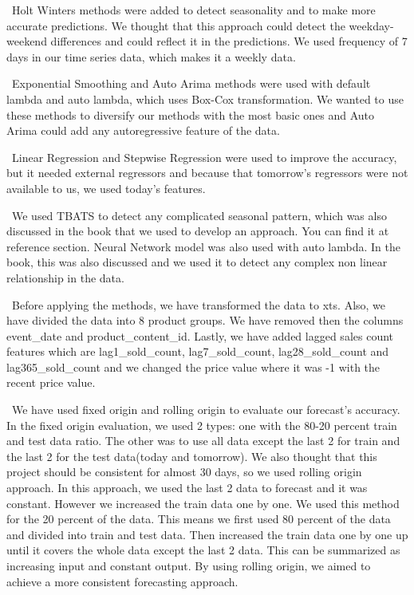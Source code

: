 \documentclass[]{article}
\begin{document}
~Holt Winters methods were added to detect seasonality and to make more
accurate predictions. We thought that this approach could detect the
weekday-weekend differences and could reflect it in the predictions. We
used frequency of 7 days in our time series data, which makes it a
weekly data.

~Exponential Smoothing and Auto Arima methods were used with default
lambda and auto lambda, which uses Box-Cox transformation. We wanted to
use these methods to diversify our methods with the most basic ones and
Auto Arima could add any autoregressive feature of the data.

~Linear Regression and Stepwise Regression were used to improve the
accuracy, but it needed external regressors and because that tomorrow's
regressors were not available to us, we used today's features.

~We used TBATS to detect any complicated seasonal pattern, which was
also discussed in the book that we used to develop an approach. You can
find it at reference section. Neural Network model was also used with
auto lambda. In the book, this was also discussed and we used it to
detect any complex non linear relationship in the data.

~Before applying the methods, we have transformed the data to xts. Also,
we have divided the data into 8 product groups. We have removed then the
columns event\_date and product\_content\_id. Lastly, we have added
lagged sales count features which are lag1\_sold\_count,
lag7\_sold\_count, lag28\_sold\_count and lag365\_sold\_count and we
changed the price value where it was -1 with the recent price value.

~We have used fixed origin and rolling origin to evaluate our forecast's
accuracy. In the fixed origin evaluation, we used 2 types: one with the
80-20 percent train and test data ratio. The other was to use all data
except the last 2 for train and the last 2 for the test data(today and
tomorrow). We also thought that this project should be consistent for
almost 30 days, so we used rolling origin approach. In this approach, we
used the last 2 data to forecast and it was constant. However we
increased the train data one by one. We used this method for the 20
percent of the data. This means we first used 80 percent of the data and
divided into train and test data. Then increased the train data one by
one up until it covers the whole data except the last 2 data. This can
be summarized as increasing input and constant output. By using rolling
origin, we aimed to achieve a more consistent forecasting approach.
\end{document}
